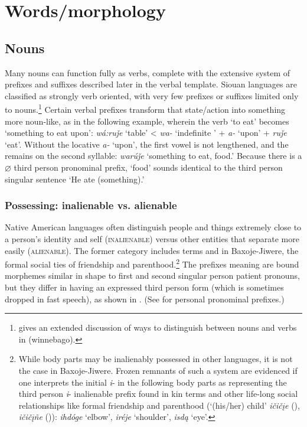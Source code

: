 \documentclass[output=paper]{LSP/langsci}
\begin{document}
\section{Words/morphology}
\subsection{Nouns}   Many nouns can function fully as verbs, complete with the extensive system of prefixes and suffixes described later in the verbal template. Siouan languages are classified as strongly verb oriented, with very few prefixes or suffixes limited only to nouns.\footnote{\citet{Helmbrecht2002} gives an extended discussion of ways to distinguish between nouns and verbs in  (winnebago).} Certain verbal prefixes transform that state/action into something more noun-like, as in the following example, wherein the verb `to eat' becomes `something to eat upon':  \textit{wá:ru\v{j}e} `table' < \textit{wa-} `indefinite ' + \textit{a-} `upon' + \textit{ru\v{j}e} `eat'. Without the locative \textit{a-} `upon', the first vowel is not lengthened, and the  remains on the second syllable: \textit{warú\v{j}e} `something to eat, food.'  Because there is a $\varnothing$ third person pronominal prefix, `food' sounds identical to the third person singular sentence `He ate (something).'

\subsubsection{Possessing: inalienable vs. alienable}  Native American languages often distinguish people and things extremely close to a person's identity and self (\textsc{inalienable}) versus other entities that separate more easily (\textsc{alienable}). The former category includes  terms and in Baxoje-Jiwere, the formal social ties of friendship and parenthood.\footnote{While body parts may be inalienably possessed in other languages, it is not the case in Baxoje-Jiwere. Frozen remnants of such a system are evidenced if one interprets the initial \textit{i}- in the following body parts as representing the third person \textit{i}- inalienable prefix found in kin terms and other life-long social relationships like formal friendship and parenthood (`(his/her) child' \textit{i\v{c}i\v{c}\k{i}e} (), \textit{i\v{c}i\v{c}\k{i}ñe} ()): \textit{ihdóge} `elbow', \textit{iréje} `shoulder', \textit{isd\k{a}} `eye'.} The prefixes meaning  are bound morphemes similar in shape to first and second singular person patient  pronouns, but they differ in having an expressed third person form (which is sometimes dropped in fast speech), as shown in . (See  for personal pronominal prefixes.)
\end{document}
